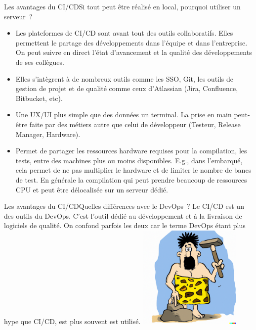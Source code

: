 \documentclass{beamer}
\begin{document}
    \begin{frame}{Les avantages du CI/CD}{Si tout peut être réalisé en local, pourquoi utiliser un serveur~?}
        \transdissolve
        \begin{itemize}
            \item Les plateformes de CI/CD sont avant tout des outils collaboratifs.
            Elles permettent le partage des développements dans l'équipe et dans l'entreprise.
            On peut suivre en direct l'état d'avancement et la qualité des développements de ses collègues.
            \item Elles s'intègrent à de nombreux outils comme les SSO, Git, les outils de gestion de projet et de qualité comme ceux d'Atlassian (Jira, Confluence, Bitbucket, etc).
            \item Une UX/UI plus simple que des données un terminal.
            La prise en main peut-être faite par des métiers autre que celui de développeur (Testeur, Release Manager, Hardware).
            \item Permet de partager les ressources hardware requises pour la compilation, les tests, entre des machines plus ou moins disponibles.
            E.g., dans l'embarqué, cela permet de ne pas multiplier le hardware et de limiter le nombre de bancs de test.
            En générale la compilation qui peut prendre beaucoup de ressources CPU et peut être délocalisée sur un serveur dédié.
        \end{itemize}
    \end{frame}

    \begin{frame}{Les avantages du CI/CD}{Quelles différences avec le DevOps~?}
        \transdissolve
        Le CI/CD est un des outils du DevOps.
        \bigbreak
        C'est l'outil dédié au développement et à la livraison de logiciels de qualité.
        On confond parfois les deux car le terme DevOps étant plus hype que CI/CD, est plus souvent est utilisé.
        \bigbreak
        \centering
        \includegraphics[width=5cm]{image/caveman-using-a-sophisticated-tool}
    \end{frame}
\end{document}
